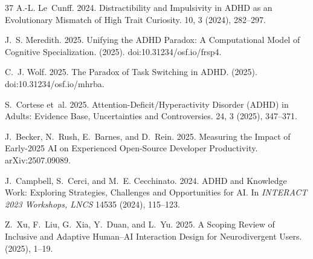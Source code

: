 \documentclass[sigconf,nonacm]{acmart}
\begin{document}
\begin{thebibliography}{37}
A.-L. Le~Cunff. 2024.
\newblock Distractibility and Impulsivity in ADHD as an Evolutionary Mismatch of High Trait Curiosity.
 10, 3 (2024), 282--297.

J.~S. Meredith. 2025.
\newblock Unifying the ADHD Paradox: A Computational Model of Cognitive Specialization.
 (2025). doi:10.31234/osf.io/frsp4.

C.~J. Wolf. 2025.
\newblock The Paradox of Task Switching in ADHD.
 (2025). doi:10.31234/osf.io/mhrba.

S.~Cortese et~al. 2025.
\newblock Attention-Deficit/Hyperactivity Disorder (ADHD) in Adults: Evidence Base, Uncertainties and Controversies.
 24, 3 (2025), 347--371.

J.~Becker, N.~Rush, E.~Barnes, and D.~Rein. 2025.
\newblock Measuring the Impact of Early-2025 AI on Experienced Open-Source Developer Productivity.
 arXiv:2507.09089.

J.~Campbell, S.~Cerci, and M.~E. Cecchinato. 2024.
\newblock ADHD and Knowledge Work: Exploring Strategies, Challenges and Opportunities for AI.
\newblock In {\em INTERACT 2023 Workshops, LNCS} 14535 (2024), 115--123.

Z.~Xu, F.~Liu, G.~Xia, Y.~Duan, and L.~Yu. 2025.
\newblock A Scoping Review of Inclusive and Adaptive Human--AI Interaction Design for Neurodivergent Users.
 (2025), 1--19.

\end{thebibliography}
\end{document}
